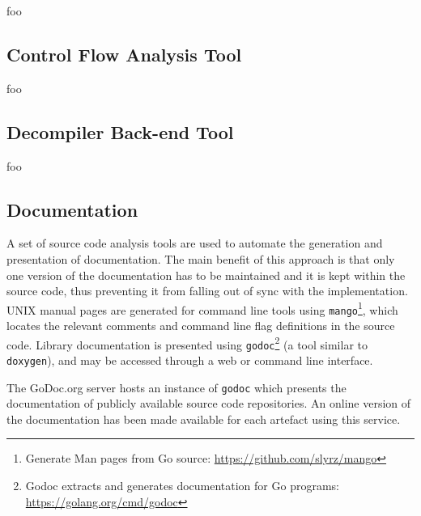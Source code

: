 foo



\subsection{Control Flow Analysis Tool}

foo


\subsection{Decompiler Back-end Tool}

foo


\subsection{Documentation}

A set of source code analysis tools are used to automate the generation and presentation of documentation. The main benefit of this approach is that only one version of the documentation has to be maintained and it is kept within the source code, thus preventing it from falling out of sync with the implementation. UNIX manual pages are generated for command line tools using \texttt{mango}\footnote{Generate Man pages from Go source: \url{https://github.com/slyrz/mango}}, which locates the relevant comments and command line flag definitions in the source code. Library documentation is presented using \texttt{godoc}\footnote{Godoc extracts and generates documentation for Go programs: \url{https://golang.org/cmd/godoc}} (a tool similar to \texttt{doxygen}), and may be accessed through a web or command line interface.

The GoDoc.org server hosts an instance of \texttt{godoc} which presents the documentation of publicly available source code repositories. An online version of the documentation has been made available for each artefact using this service.

